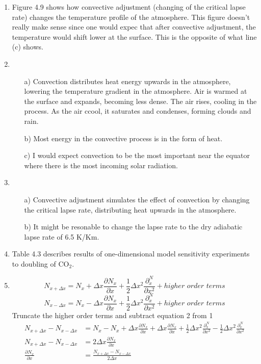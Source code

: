 \documentclass[11pt,oneside]{article}
\begin{document}
\begin{enumerate}
\item Figure 4.9 shows how convective adjustment (changing of the critical lapse rate) changes the temperature profile of the atmosphere.  This figure doesn't really make sense since one would expec that after convective adjustment, the temperature would shift lower at the surface.  This is the opposite of what line (c) shows. 


\item
\begin{enumerate}
	\item[a)] Convection distributes heat energy upwards in the atmosphere, lowering the temperature gradient in the atmosphere.  Air is warmed at the surface and expands, becoming less dense. The air rises, cooling in the process.  As the air ccool, it saturates and condenses, forming clouds and rain. 
	\item[b)] Most energy in the convective process is in the form of heat. 
	\item[c)] I would expect convection to be the most important near the equator where there is the most incoming solar radiation. 
\end{enumerate}

\item
\begin{enumerate}
	\item[a)] Convective adjustment simulates the effect of convection by changing the critical lapse rate, distributing heat upwards in the atmosphere. 
	\item[b)] It might be resonable to change the lapse rate to the dry adiabatic lapse rate of 6.5 K/Km.  
\end{enumerate}

\item Table 4.3 describes results of one-dimensional model sensitivity experiments to doubling of CO$_2$.  

\item
\begin{equation}
N_{x+\Delta x} = N_x + \Delta x\frac{\partial N_x}{\partial x} + \frac{1}{2}\Delta x^2\frac{\partial^ N_x}{\partial x^2} + higher\,\,order\,\,terms
\end{equation}
\begin{equation}
N_{x-\Delta x} = N_x - \Delta x\frac{\partial N_x}{\partial x} + \frac{1}{2}\Delta x^2\frac{\partial^ N_x}{\partial x^2} + higher\,\,order\,\,terms
\end{equation}
Truncate the higher order terms and subtract equation 2 from 1 
\begin{align}
N_{x+\Delta x} - N_{x-\Delta x} &= N_x - N_x + \Delta x\frac{\partial N_x}{\partial x} + \Delta x\frac{\partial N_x}{\partial x} + \frac{1}{2}\Delta x^2\frac{\partial^ N_x}{\partial x^2} - \frac{1}{2}\Delta x^2\frac{\partial^ N_x}{\partial x^2}\nonumber\\
N_{x+\Delta x} - N_{x-\Delta x} &= 2\Delta x\frac{\partial N_x}{\partial x}\nonumber\\
\nonumber\frac{\partial N_x}{\partial x} &= \frac{N_{x+\Delta x} - N_{x-\Delta x}}{2\Delta x}
\end{align}


\end{enumerate}
\end{document}
